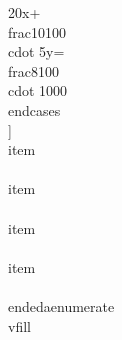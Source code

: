 		 20x+\\frac{10}{100}\\cdot 5y=\\frac{8}{100}\\cdot 1000
		\\end{cases}
	       \\]
	 \\item \\[
		\\begin{cases}
		 \\displaystyle \\frac{x+y}{2}=\\frac{5}{3}\\\\
		 \\displaystyle \\frac{(x+2)+(2y-7)}{2}=-\\frac{1}{3}
		\\end{cases}
	       \\]
	 \\item \\[
		\\begin{cases}
		 y=x-2\\\\
		 x-5(x+y)=-2
		\\end{cases}
	       \\]
	 \\item \\[
	       4x+3y+10=2y-3x+6=4y+3
	       \\]
	 \\item \\[
	       x+2y=3x+7y=x-4
	       \\]
       \\end{edaenumerate}
 \\vfill

